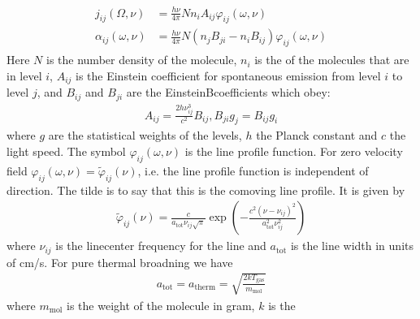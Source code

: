 \documentclass[letterpaper,10pt,english]{sphinxmanual}
\begin{document}
\label{\detokenize{lineradtrans:eq-molec-emis-def}}\label{\detokenize{lineradtrans:eq-molec-extinct-def}}\begin{equation*}
\begin{split}\begin{split}
j_{ij}(\Omega,\nu) &= \frac{h\nu}{4\pi}Nn_iA_{ij}
\varphi_{ij}(\omega,\nu) \\
\alpha_{ij}(\omega,\nu) &= \frac{h\nu}{4\pi}N(n_jB_{ji}-n_iB_{ij})
\varphi_{ij}(\omega,\nu)
\end{split}\end{split}
\end{equation*}
Here \(N\) is the number density of the molecule, \(n_i\) is the  of the molecules that are in level \(i\), \(A_{ij}\) is the
Einstein coefficient for spontaneous emission from level \(i\) to level
\(j\), and \(B_{ij}\) and \(B_{ji}\) are the Einstein\sphinxhyphen{}B\sphinxhyphen{}coefficients which obey:
\begin{equation*}
\begin{split}A_{ij}     = \frac{2h\nu_{ij}^3}{c^2} B_{ij},
B_{ji}g_j  = B_{ij} g_i\end{split}
\end{equation*}
where \(g\) are the statistical weights of the levels, \(h\) the Planck constant
and \(c\) the light speed. The symbol \(\varphi_{ij}(\omega,\nu)\) is the line
profile function. For zero velocity field
\(\varphi_{ij}(\omega,\nu)=\tilde\varphi_{ij}(\nu)\), i.e. the line profile
function is independent of direction. The tilde is to say that this is
the comoving line profile. It is given by
\begin{equation*}
\begin{split}\tilde\varphi_{ij}(\nu) = \frac{c}{a_{\mathrm{tot}}\nu_{ij}\sqrt{\pi}}
\exp\left(-\frac{c^2(\nu-\nu_{ij})^2}{a_{\mathrm{tot}}^2\nu_{ij}^2}\right)\end{split}
\end{equation*}
where \(\nu_{ij}\) is the line\sphinxhyphen{}center frequency for the line and
\(a_{\mathrm{tot}}\) is the line width in units of cm/s. For pure
thermal broadning we have
\begin{equation*}
\begin{split}a_{\mathrm{tot}}=a_{\mathrm{therm}}=\sqrt{\frac{2kT_{\mathrm{gas}}}{m_{\mathrm{mol}}}}\end{split}
\end{equation*}
where \(m_{\mathrm{mol}}\) is the weight of the molecule in gram, \(k\) is the
\end{document}
